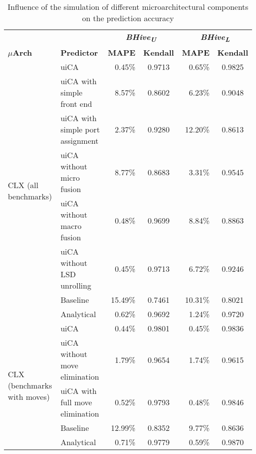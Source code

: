 \documentclass[sigconf,nonacm]{acmart}
\newcommand{\bhivel}{\emph{BHive\textsubscript{L}}\xspace}
\newcommand{\bhiveu}{\emph{BHive\textsubscript{U}}\xspace}
\newcommand{\uiCA}{uiCA\xspace}
\begin{document}
\begin{table*}
\caption{Influence of the simulation of different microarchitectural components on the prediction accuracy}
\begin{tabular}{llrcrc}
\toprule
& & \multicolumn{2}{c}{\textbf{\bhiveu}} & \multicolumn{2}{c}{\textbf{\bhivel}}\\  \cmidrule(lr){3-4}\cmidrule(lr){5-6}
\textbf{{$\mu$}Arch} & \textbf{Predictor} & \textbf{MAPE} & \textbf{Kendall} & \textbf{MAPE} & \textbf{Kendall}\\
\midrule
\multirow{8}{*}{CLX (all benchmarks)} & \uiCA & 0.45\% & 0.9713 & 0.65\% & 0.9825 \\
                      & \uiCA with simple front end & 8.57\% & 0.8602 & 6.23\% & 0.9048\\
                      & \uiCA with simple port assignment & 2.37\% & 0.9280 & 12.20\% & 0.8613\\
                      & \uiCA without micro fusion & 8.77\% & 0.8683 & 3.31\% & 0.9545\\
                      & \uiCA without macro fusion & 0.48\% & 0.9699 & 8.84\% & 0.8863\\
                      & \uiCA without LSD unrolling & 0.45\% & 0.9713 & 6.72\% & 0.9246\\
                      & Baseline & 15.49\% & 0.7461 & 10.31\% & 0.8021\\
                      & Analytical & 0.62\% & 0.9692 & 1.24\% & 0.9720\\
\midrule
\multirow{5}{*}{CLX (benchmarks with moves)} & \uiCA & 0.44\% & 0.9801 & 0.45\% & 0.9836 \\
                      & \uiCA without move elimination & 1.79\% & 0.9654 & 1.74\% & 0.9615\\
                      & \uiCA with full move elimination & 0.52\% & 0.9793 & 0.48\% & 0.9846\\
                      & Baseline & 12.99\% & 0.8352 & 9.77\% & 0.8636\\
                      & Analytical & 0.71\% & 0.9779 & 0.59\% & 0.9870\\
\bottomrule
\end{tabular}
\end{table*}
\end{document}
